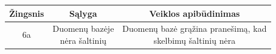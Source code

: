 \documentclass[12pt]{article}
\begin{document}
\begin{enumerate}
		\begin{center}
		\begin{tabular}{ | c | c | c | }
			\hline
			Žingsnis & Sąlyga         & Veiklos apibūdinimas \\ \hline
			6a       & \makecell{Duomenų bazėje \\ nėra šaltinių} & \makecell{Duomenų bazė grąžina pranešimą, kad \\ skelbimų šaltinių nėra} \\ \hline
		\end{tabular}
		\end{center}	
		
	\end{enumerate}	
	
\end{document}
